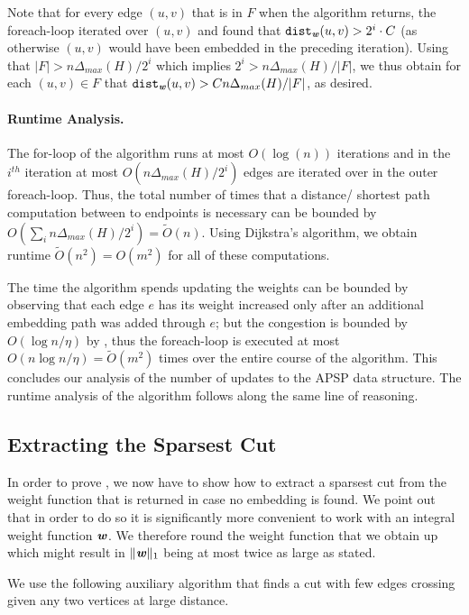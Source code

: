 Note that for every edge $(u,v)$ that is in $F$ when the algorithm returns, the foreach-loop iterated over $(u,v)$ and found that $\operatorname{\mathtt{dist}}_{\boldsymbol{\mathit{w}}}(u,v) > 2^i \cdot C$ (as otherwise $(u,v)$ would have been embedded in the preceding iteration). Using that $|F| > n \Delta_{max}(H)/2^i$ which implies $2^i > n \Delta_{max}(H)/ |F|$, we thus obtain for each $(u,v) \in F$ that $\operatorname{\mathtt{dist}}_{\boldsymbol{\mathit{w}}}(u,v) > C n \Delta_{max}(H)/ |F|$, as desired.

\paragraph{Runtime Analysis.} The for-loop of the algorithm runs at most $O(\log (n))$ iterations and in the $i^{th}$ iteration at most $O(n \Delta_{max}(H) /2^i)$ edges are iterated over in the outer foreach-loop. Thus, the total number of times that a distance/ shortest path computation between to endpoints is necessary can be bounded by $O(\sum_i n \Delta_{max}(H) /2^i) = \tilde{O}(n)$.  Using Dijkstra's algorithm, we obtain runtime $\tilde{O}(n^2) = O(m^2)$ for all of these computations.

The time the algorithm spends updating the weights can be bounded by observing that each edge $e$ has its weight increased only after an additional embedding path was added through $e$; but the congestion is bounded by $O(\log n/\eta)$ by , thus the foreach-loop is executed at most $O(n\log n/\eta) = \tilde{O}(m^2)$ times over the entire course of the algorithm. This concludes our analysis of the number of updates to the APSP data structure. The runtime analysis of the algorithm follows along the same line of reasoning.

\subsection{Extracting the Sparsest Cut}

In order to prove , we now have to show how to extract a sparsest cut from the weight function that is returned in case no embedding is found. We point out that in order to do so it is significantly more convenient to work with an integral weight function $\boldsymbol{\mathit{w}}$. We therefore round the weight function that we obtain  up which might result in $\|\boldsymbol{\mathit{w}}\|_1$ being at most twice as large as stated.

We use the following auxiliary algorithm that finds a cut with few edges crossing given any two vertices at large distance. 

